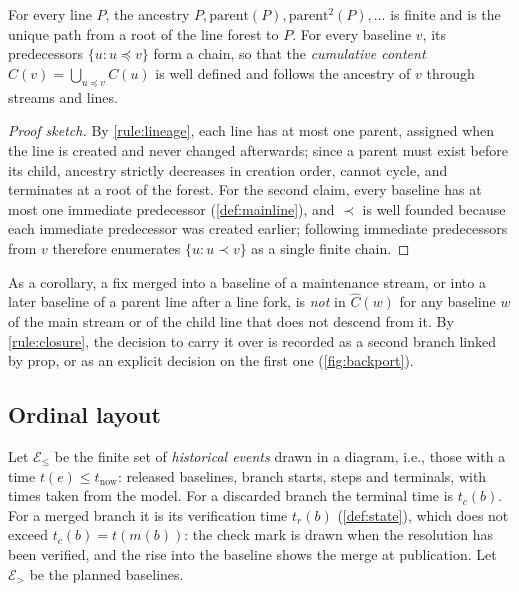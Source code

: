 \begin{property}[Lineage]
  \label{prop:lineage}
  For every line $P$, the ancestry $P, \mathrm{parent}(P),
  \mathrm{parent}^2(P), \dots$ is finite and is the unique path from a root
  of the line forest to $P$. For every baseline $v$, its predecessors
  $\{u : u \preceq v\}$ form a chain, so that the \emph{cumulative content}
  $\widehat{C}(v) = \bigcup_{u \preceq v} C(u)$ is well defined and follows
  the ancestry of $v$ through streams and lines.
\end{property}
\begin{proof}[Proof sketch]
  By \cref{rule:lineage}, each line has at most one parent, assigned when
  the line is created and never changed afterwards; since a parent must
  exist before its child, ancestry strictly decreases in creation order,
  cannot cycle, and terminates at a root of the forest. For the second
  claim, every baseline has at most one immediate predecessor
  (\cref{def:mainline}), and $\prec$ is well founded because each
  immediate predecessor was created earlier; following immediate
  predecessors from $v$ therefore enumerates $\{u : u \prec v\}$ as a
  single finite chain.
\end{proof}

\noindent As a corollary, a fix merged into a baseline of a maintenance
stream, or into a later baseline of a parent line after a line fork, is
\emph{not} in $\widehat{C}(w)$ for any baseline $w$ of the main stream or
of the child line that does not descend from it. By \cref{rule:closure},
the decision to carry it over is recorded as a second branch linked by
$\mathrm{prop}$, or as an explicit decision on the first one
(\cref{fig:backport}).

\subsection{Ordinal layout}
\label{app:formal-ordinal}

Let $\mathcal{E}_{\le}$ be the finite set of \emph{historical events}
drawn in a diagram, i.e., those with a time $t(e) \le t_{\mathrm{now}}$:
released baselines, branch starts, steps and terminals, with times taken
from the model. For a discarded branch the terminal time is $t_c(b)$. For
a merged branch it is its verification time $t_r(b)$ (\cref{def:state}),
which does not exceed $t_c(b) = t(m(b))$: the check mark is drawn when the
resolution has been verified, and the rise into the baseline shows the
merge at publication. Let $\mathcal{E}_{>}$ be the planned baselines.

